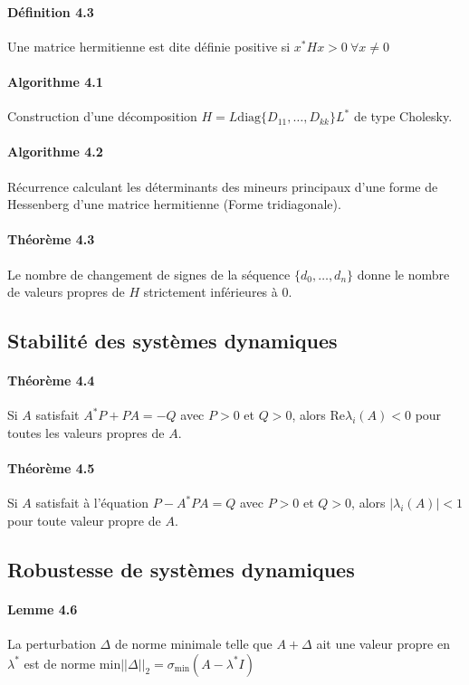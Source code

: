 \paragraph{Définition 4.3} Une matrice hermitienne est dite définie positive si $x^*Hx > 0 \ \forall x \neq 0$

\paragraph{Algorithme 4.1} Construction d'une décomposition $H = L\text{diag}\{D_{11},\dots,D_{kk}\}L^*$ de type Cholesky.

\paragraph{Algorithme 4.2} Récurrence calculant les déterminants des mineurs principaux d'une forme de Hessenberg d'une matrice hermitienne (Forme tridiagonale).

\paragraph{Théorème 4.3} Le nombre de changement de signes de la séquence $\{d_0,\dots,d_n\}$ donne le nombre de valeurs propres de $H$ strictement inférieures à 0.

\subsection{Stabilité des systèmes dynamiques}

\paragraph{Théorème 4.4} Si $A$ satisfait $A^*P + PA = -Q$ avec $P>0$ et $Q>0$, alors Re$\lambda_i(A)<0$ pour toutes les valeurs propres de $A$.

\paragraph{Théorème 4.5} Si $A$ satisfait à l'équation $P-A^*PA = Q$ avec $P>0$ et $Q>0$, alors $|\lambda_i(A)|<1$ pour toute valeur propre de $A$.

\subsection{Robustesse de systèmes dynamiques}

\paragraph{Lemme 4.6} La perturbation $\Delta$ de norme minimale telle que $A+\Delta$ ait une valeur propre en $\lambda^*$ est de norme $\text{min} ||\Delta||_2 = \sigma_{\text{min}} (A-\lambda^*I)$

